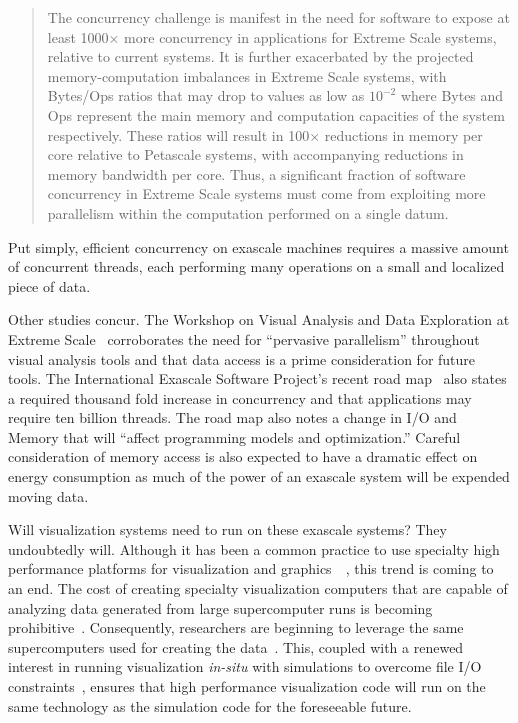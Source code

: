 \documentclass{vgtc}                          %
\newcommand*{\lcite}[1]{~\cite{#1}}
\begin{document}
\begin{quote}
  The concurrency challenge is manifest in the need for software to expose
  at least 1000$\times$ more concurrency in applications for Extreme Scale
  systems, relative to current systems. It is further exacerbated by the
  projected memory-computation imbalances in Extreme Scale systems, with
  Bytes/Ops ratios that may drop to values as low as $10^{-2}$ where Bytes
  and Ops represent the main memory and computation capacities of the
  system respectively. These ratios will result in 100$\times$ reductions
  in memory per core relative to Petascale systems, with accompanying
  reductions in memory bandwidth per core.  Thus, a significant fraction of
  software concurrency in Extreme Scale systems must come from exploiting
  more parallelism within the computation performed on a single datum.
\end{quote}

Put simply, efficient concurrency on exascale machines requires a massive
amount of concurrent threads, each performing many operations on a small
and localized piece of data.

Other studies concur.  The Workshop on Visual Analysis and Data Exploration
at Extreme Scale\lcite{VisAnalysisExtremeScale} corroborates the need for
``pervasive parallelism'' throughout visual analysis tools and that data
access is a prime consideration for future tools.  The International
Exascale Software Project's recent road map\lcite{ExascaleRoadMap} also
states a required thousand fold increase in concurrency and that
applications may require ten billion threads.  The road map also notes a
change in I/O and Memory that will ``affect programming models and
optimization.''  Careful consideration of memory access is also expected
to have a dramatic effect on energy consumption as much of the power of an
exascale system will be expended moving data.

Will visualization systems need to run on these exascale systems?  They
undoubtedly will.  Although it has been a common practice to use specialty
high performance platforms for visualization and graphics~\lcite{Wylie01},
this trend is coming to an end.  The cost of creating specialty
visualization computers that are capable of analyzing data generated from
large supercomputer runs is becoming prohibitive\lcite{Childs07}.
Consequently, researchers are beginning to leverage the same supercomputers
used for creating the data\lcite{Peterka09:SC,Peterka09:SciDAC,Yu08}.
This, coupled with a renewed interest in running visualization
\emph{in-situ} with simulations to overcome file I/O
constraints\lcite{SNL092014,Tu06,Ross08}, ensures that high performance
visualization code will run on the same technology as the simulation code
for the foreseeable future.
\end{document}
